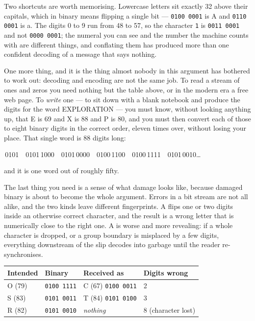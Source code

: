 Two shortcuts are worth memorising. Lowercase letters sit exactly 32 above their capitals, which
in binary means flipping a single bit --- \texttt{0100\,0001} is A and \texttt{0110\,0001} is a. The
digits 0 to 9 run from 48 to 57, so the character \texttt{1} is \texttt{0011\,0001} and not
\texttt{0000\,0001}; the numeral you can see and the number the machine counts with are different
things, and conflating them has produced more than one confident decoding of a message that says
nothing.

One more thing, and it is the thing almost nobody in this argument has bothered to work
out: decoding and encoding are not the same job.  To read a stream of ones and zeros you need nothing but the
table above, or in the modern era a free web page. To \emph{write} one --- to sit down with a
blank notebook and produce the digits for the word EXPLORATION --- you must know, without
looking anything up, that E is 69 and X is 88 and P is 80, and you must then convert each of
those to eight binary digits in the correct order, eleven times over, without losing your
place. That single word is 88 digits long:

\begin{center}\footnotesize{}\,0101\ \ 0101\,1000\ \ 0101\,0000\ \ 0100\,1100\ \ 0100\,1111\ \ 0101\,0010\ldots
\end{center}

\noindent and it is one word out of roughly fifty.

The last thing you need is a sense of what damage looks like, because damaged binary is about
to become the whole argument. Errors in a bit stream are not all alike, and the two kinds leave
different fingerprints. A  flips one or two digits inside an otherwise correct
character, and the result is a wrong letter that is numerically close to the right one. A
 is worse and more revealing: if a whole character is dropped, or a group
boundary is misplaced by a few digits, everything downstream of the slip decodes into garbage
until the reader re-synchronises.

\begin{center}\small
\setlength{\tabcolsep}{0.8em}
\begin{tabular}{@{}l l l l@{}}
\toprule
\textbf{Intended} & \textbf{Binary} & \textbf{Received as} & \textbf{Digits wrong}\\
\midrule
O (79) & \texttt{0100\,1111} & C (67) \texttt{0100\,0011} & 2\\
S (83) & \texttt{0101\,0011} & T (84) \texttt{0101\,0100} & 3\\
R (82) & \texttt{0101\,0010} & \emph{nothing} & 8 (character lost)\\
\bottomrule
\end{tabular}
\end{center}

